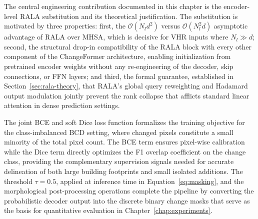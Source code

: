 The central engineering contribution documented in this chapter is the
encoder-level RALA substitution and its theoretical justification. The
substitution is motivated by three properties: first, the $\mathcal{O}(N_l d^2)$
versus $\mathcal{O}(N_l^2 d)$ asymptotic advantage of RALA over MHSA,
which is decisive for VHR inputs where $N_l \gg d$; second, the structural
drop-in compatibility of the RALA block with every other component of the
ChangeFormer architecture, enabling initialization from pretrained encoder
weights without any re-engineering of the decoder, skip connections, or FFN
layers; and third, the formal guarantee, established in
Section~\ref{sec:rala-theory}, that RALA's global query reweighting and
Hadamard output modulation jointly prevent the rank collapse that afflicts
standard linear attention in dense prediction settings.

The joint BCE and soft Dice loss function formalizes the training objective
for the class-imbalanced BCD setting, where changed pixels constitute a
small minority of the total pixel count. The BCE term ensures pixel-wise
calibration while the Dice term directly optimizes the F1 overlap coefficient
on the change class, providing the complementary supervision signals needed
for accurate delineation of both large building footprints and small isolated
additions. The threshold $\tau = 0.5$, applied at inference time in
Equation~\ref{eq:masking}, and the morphological post-processing operations
complete the pipeline by converting the probabilistic decoder output into the
discrete binary change masks that serve as the basis for quantitative
evaluation in Chapter~\ref{chap:experiments}.
